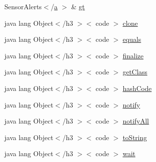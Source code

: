 \begin{DoxyCompactItemize}
 Sensor\-Alerts$<$/\hyperlink{style_8css_a5e8981582017bb8b84c21f148345d1f7}{a} $>$ \& \hyperlink{_database_2_fetch_sensor_alerts_8html_ae5d6fbc28ae374bf3f5b61ed6936512d}{gt}
\item 
java lang Object$<$/h3 $>$$<$ code $>$ \hyperlink{_database_2_fetch_sensor_alerts_8html_adc9607fcabf6f2d7f401ad52015ef6e0}{clone}
\item 
java lang Object$<$/h3 $>$$<$ code $>$ \hyperlink{_database_2_fetch_sensor_alerts_8html_a8974318cea585f72df717e0380ec7104}{equals}
\item 
java lang Object$<$/h3 $>$$<$ code $>$ \hyperlink{_database_2_fetch_sensor_alerts_8html_ab2315181ead4aeedef2374039b6ddde7}{finalize}
\item 
java lang Object$<$/h3 $>$$<$ code $>$ \hyperlink{_database_2_fetch_sensor_alerts_8html_a98e6644727fe65eac217a6855045be43}{get\-Class}
\item 
java lang Object$<$/h3 $>$$<$ code $>$ \hyperlink{_database_2_fetch_sensor_alerts_8html_a8e178e2bb2bef055ea23ea3910a221ca}{hash\-Code}
\item 
java lang Object$<$/h3 $>$$<$ code $>$ \hyperlink{_database_2_fetch_sensor_alerts_8html_ae99ae10b5010594dbda4794e02db271b}{notify}
\item 
java lang Object$<$/h3 $>$$<$ code $>$ \hyperlink{_database_2_fetch_sensor_alerts_8html_a1279357e6e09e33e75b55eb05fdb6436}{notify\-All}
\item 
java lang Object$<$/h3 $>$$<$ code $>$ \hyperlink{_database_2_fetch_sensor_alerts_8html_a36e8a76a4132c9a7081416f27d087615}{to\-String}
\item 
java lang Object$<$/h3 $>$$<$ code $>$ \hyperlink{_database_2_fetch_sensor_alerts_8html_a9a9f0c22e5688d478c707f910f1c1aea}{wait}
\end{DoxyCompactItemize}


